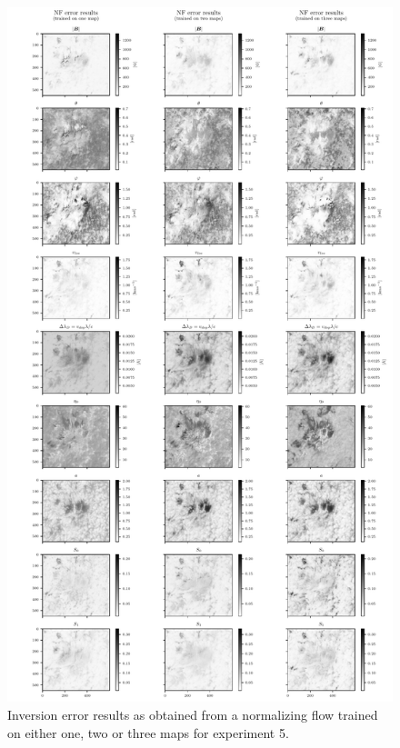 \documentclass[a4paper,11pt]{report}
\begin{document}
\begin{figure}[h]
\centering
\includegraphics[height=\textheight-1cm]{figures/nf-milne-eddington-example-5-nflows-piecewisequadratic-comp-ME-NF-errors.pdf}
\caption{Inversion error results as obtained from a normalizing flow trained on either one, two or three maps for experiment 5.}
\label{fig:nf-milne-eddington-example-5-nflows-piecewisequadratic-comp-ME-NF-errors}
\end{figure}
\end{document}
